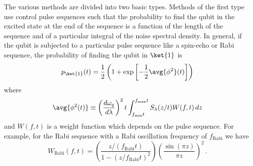 The various methods are divided into two basic types.
Methods of the first type use control pulse sequences such that the probability to find the qubit in the excited state at the end of the sequence is a function of the length of the sequence and of a particular integral of the noise spectral density.
In general, if the qubit is subjected to a particular pulse sequence like a spin-echo or Rabi sequence, the probability of finding the qubit in $\ket{1}$ is
\begin{equation}
p_{\ket{1}}(t) = \frac{1}{2} \left( 1 + \exp \left[ -\frac{1}{2} \avg{\phi^2}(t) \right] \right)
\end{equation} 
where
\begin{equation}
\avg{\phi^2 (t)} \equiv \left( \frac{d \omega_q}{d \lambda} \right)^2 t \int_{f_\text{min} t}^{f_\text{max} t} S_\lambda (z/t) W(f,t) \, dz
\end{equation}
and $W(f, t)$ is a weight function which depends on the pulse sequence.
For example, for the Rabi sequence with a Rabi oscillation frequency of $f_\text{Rabi}$ we have
\begin{equation}
W_\text{Rabi}(f,t) = \left( \frac{z / (f_\text{Rabi} t)}{1 - \left(z / f_\text{Rabi} t \right)^2} \right) \left( \frac{\sin(\pi z)}{\pi z} \right)^2 \, .
\end{equation}
